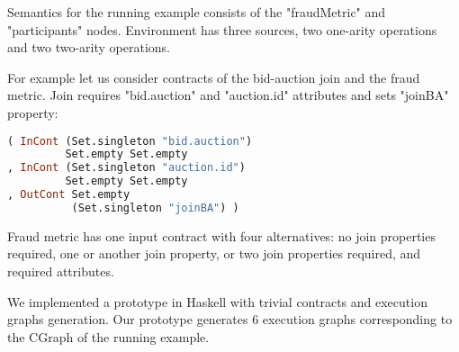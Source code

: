 Semantics for the running example consists of the "fraudMetric" and "participants" nodes.
Environment has three sources, two one-arity operations and two two-arity operations.

For example let us consider contracts of the bid-auction join and the fraud metric.
Join requires "bid.auction" and "auction.id" attributes and sets "joinBA" property:
\begin{lstlisting}[language=Haskell]
( InCont (Set.singleton "bid.auction")
         Set.empty Set.empty
, InCont (Set.singleton "auction.id")
         Set.empty Set.empty
, OutCont Set.empty
          (Set.singleton "joinBA") )
\end{lstlisting}

Fraud metric has one input contract with four alternatives: no join properties required, one or another join property, or two join properties required, and required attributes.

We implemented a prototype in Haskell with trivial contracts and execution graphs generation.
Our prototype generates 6 execution graphs corresponding to the CGraph of the running example.
